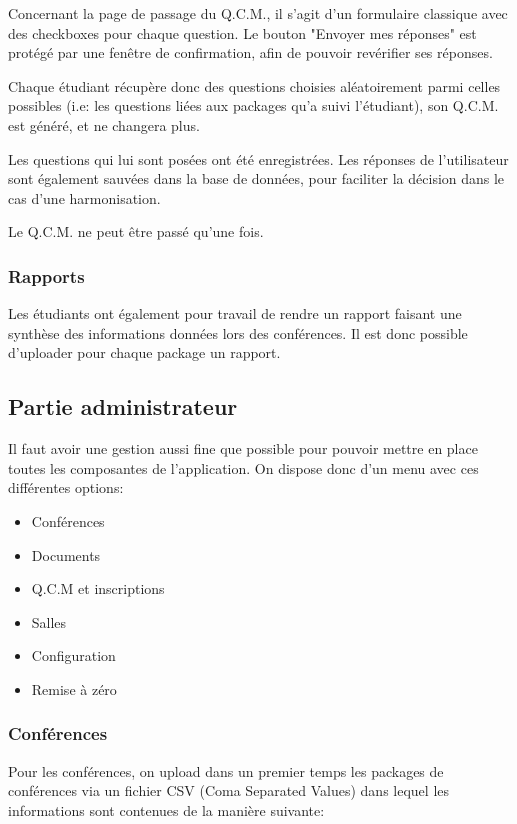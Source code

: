 Concernant la page de passage du Q.C.M., il s'agit d'un formulaire classique avec des checkboxes pour chaque question.
Le bouton "Envoyer mes réponses" est protégé par une fenêtre de confirmation, afin de pouvoir revérifier ses réponses.

Chaque étudiant récupère donc des questions choisies aléatoirement parmi celles possibles (i.e: les questions liées aux packages qu'a
suivi l'étudiant), son Q.C.M. est généré, et ne changera plus.

Les questions qui lui sont posées ont été enregistrées. Les réponses de l'utilisateur sont également sauvées dans la base de données,
pour faciliter la décision dans le cas d'une harmonisation.

Le Q.C.M. ne peut être passé qu'une fois.

            \subsubsection{Rapports}

Les étudiants ont également pour travail de rendre un rapport faisant une synthèse des informations données lors des conférences.
Il est donc possible d'uploader pour chaque package un rapport.

        \subsection{Partie administrateur}

Il faut avoir une gestion aussi fine que possible pour pouvoir mettre en place toutes les composantes de l'application.
On dispose donc d'un menu avec ces différentes options:

    \begin{itemize}
    \item Conférences
    \item Documents
    \item Q.C.M et inscriptions
    \item Salles
    \item Configuration
    \item Remise à zéro
    \end{itemize}

            \subsubsection{Conférences}

Pour les conférences, on upload dans un premier temps les packages de conférences via un fichier CSV (Coma Separated Values)
dans lequel les informations sont contenues de la manière suivante:

